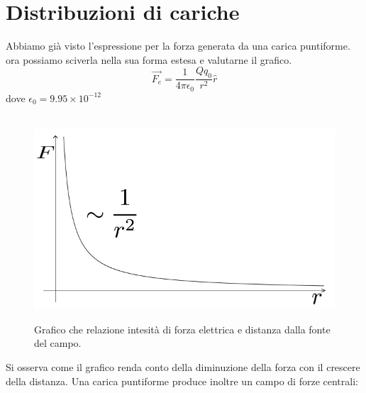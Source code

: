 \documentclass[11pt]{article}
\begin{document}
\section{Distribuzioni di cariche}
Abbiamo già visto l'espressione per la forza generata da una carica puntiforme. ora possiamo sciverla nella sua forma estesa e valutarne il grafico.
$$\overrightarrow{F_e}=\frac{1}{4\pi\epsilon_0}\frac{Qq_0}{r^2}\hat r$$
dove $\epsilon_0=9.95\times 10^{-12}$
\begin{center}
\begin{figure}[H]
			  \vspace{-10pt}
              \hspace{-90pt}
              ~~~~~~~~~~~~~~~~~~~~~~~~~~~~~~~~~~~~~~~~~~~ \includegraphics[scale=0.72]{forza_elettrica}
               \caption{\small{Grafico che relazione intesità di forza elettrica e distanza dalla fonte del campo.}}
               \end{figure} 
               \end{center}
               Si osserva come il grafico renda conto della diminuzione della forza con il crescere della distanza.
               \newpage
               Una carica puntiforme produce inoltre un campo di forze centrali:
\end{document}
